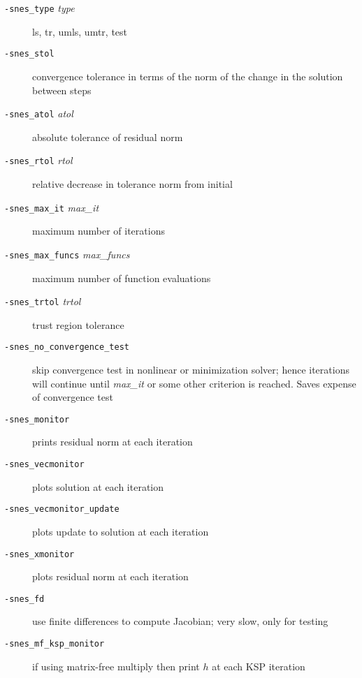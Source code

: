 \documentclass[12pt]{article}
\begin{document}
\begin{description}

\item[\texttt{-snes\_type} \textit{type}]
	ls, tr, umls, umtr, test 

\item[\texttt{-snes\_stol}]
	convergence tolerance in terms of the norm of the change in
	the solution between steps

\item[\texttt{-snes\_atol} \textit{atol}]
	absolute tolerance of residual norm

\item[\texttt{-snes\_rtol} \textit{rtol}]
	relative decrease in tolerance norm from initial

\item[\texttt{-snes\_max\_it} \textit{max\_it}] 
	maximum number of iterations

\item[\texttt{-snes\_max\_funcs} \textit{max\_funcs}]
	maximum number of function evaluations 

\item[\texttt{-snes\_trtol} \textit{trtol}]
	trust region tolerance 

\item[\texttt{-snes\_no\_convergence\_test}]
	skip convergence test in nonlinear or minimization solver;
	hence iterations will continue until \textit{max\_it} or some
	other criterion is reached.  Saves expense of convergence test

\item[\texttt{-snes\_monitor}] 
	prints residual norm at each iteration 

\item[\texttt{-snes\_vecmonitor}]
	plots solution at each iteration 

\item[\texttt{-snes\_vecmonitor\_update}]
	plots update to solution at each iteration 

\item[\texttt{-snes\_xmonitor}]
	plots residual norm at each iteration 

\item[\texttt{-snes\_fd}]
	use finite differences to compute Jacobian; very slow, only
	for testing

\item[\texttt{-snes\_mf\_ksp\_monitor}]
	if using matrix-free multiply then print $h$ at each KSP
	iteration

\end{description}
\end{document}
